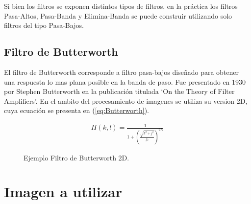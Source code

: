 \documentclass[
  letterpaper,
  twocolumn,
  9pt,
  journal,
  final]{IEEEtran}
\begin{document}
Si bien los filtros se exponen distintos tipos de filtros, en la práctica los filtros Pasa-Altos, Pasa-Banda y Elimina-Banda se puede construir utilizando solo filtros del tipo Pasa-Bajos.

\subsection{Filtro de Butterworth}

El filtro de Butterworth corresponde a filtro pasa-bajos diseñado para obtener una respuesta lo mas plana posible en la banda de paso. Fue presentado en 1930 por Stephen Butterworth en la publicación titulada `On the Theory of Filter Amplifiers'. En el ambito del procesamiento de imagenes se utiliza su version 2D, cuya ecuación se presenta en (\ref{eq:Butterworth}).

\begin{align}
H(k,l) = \frac{1}{ 1 + \left(  \frac{ \sqrt{k^2 + j^2} }{f_c}  \right) ^{2N} } \label{eq:Butterworth}
\end{align}

\begin{figure}[!tbh]
  \begin{center}
  \end{center}
  \caption{Ejemplo Filtro de Butterworth 2D.} \label{fig:butter_fft}
\end{figure}

\section{Imagen a utilizar}
\end{document}
